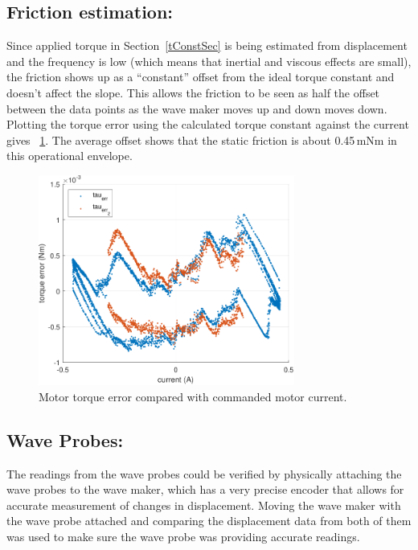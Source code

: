 \documentclass[hardware,article,submit,pdftex,moreauthors]{Definitions/mdpi}
\begin{document}
\subsection{Friction estimation:}\label{friction}
Since applied torque in Section~\ref{tConstSec} is being estimated from displacement and the frequency is low (which means that inertial and viscous effects are small), the friction shows up as a ``constant'' offset from the ideal torque constant and doesn't affect the slope.
This allows the friction to be seen as half the offset between the data points as the wave maker moves up and down moves down. 
Plotting the torque error using the calculated torque constant against the current gives \figurename~\ref{fig:TorqueError}.
The average offset shows that the static friction is about 0.45\,mNm in this operational envelope.

\begin{figure}[tb]
  \centering
  \includegraphics[width=0.75\textwidth]{diagrams/TorqueError.pdf}
  \caption{Motor torque error compared with commanded motor current.}
  \label{fig:TorqueError}
\end{figure}


\subsection{Wave Probes:}	\label{waveprobes}
The readings from the wave probes could be verified by physically attaching the wave probes to the wave maker, which has a very precise encoder that allows for accurate measurement of changes in displacement.
Moving the wave maker with the wave probe attached and comparing the displacement data from both of them was used to make sure the wave probe was providing accurate readings.
\end{document}
